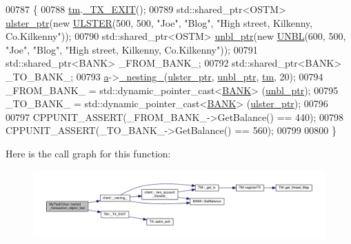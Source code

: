 \begin{DoxyCode}
00787                                                \{
00788     \hyperlink{class_my_test_c_ase_a422e6e5d4ddedea384be96031c89b72b_a422e6e5d4ddedea384be96031c89b72b}{tm}.\hyperlink{class_t_m_a5e2d1127f2429f2f524d25f430eade06_a5e2d1127f2429f2f524d25f430eade06}{\_TX\_EXIT}();
00789     std::shared\_ptr<OSTM> \hyperlink{class_my_test_c_ase_a4f9f72374d3d15be7cdf16412c4d7ed3_a4f9f72374d3d15be7cdf16412c4d7ed3}{ulster\_ptr}(\textcolor{keyword}{new} \hyperlink{class_u_l_s_t_e_r}{ULSTER}(500, 500, \textcolor{stringliteral}{"Joe"}, \textcolor{stringliteral}{"Blog"}, \textcolor{stringliteral}{"High street,
       Kilkenny, Co.Kilkenny"}));
00790     std::shared\_ptr<OSTM> \hyperlink{class_my_test_c_ase_a0ca634b597d6c0e136d632268853d5a7_a0ca634b597d6c0e136d632268853d5a7}{unbl\_ptr}(\textcolor{keyword}{new} \hyperlink{class_u_n_b_l}{UNBL}(600, 500, \textcolor{stringliteral}{"Joe"}, \textcolor{stringliteral}{"Blog"}, \textcolor{stringliteral}{"High street, Kilkenny,
       Co.Kilkenny"}));
00791     std::shared\_ptr<BANK> \_FROM\_BANK\_;
00792     std::shared\_ptr<BANK> \_TO\_BANK\_;
00793     \hyperlink{class_my_test_c_ase_a08f3a55850ffce171406f81f2f6c9c74_a08f3a55850ffce171406f81f2f6c9c74}{a}->\hyperlink{classclient_ac0ebebd379895869c22f8919ad3bd37f_ac0ebebd379895869c22f8919ad3bd37f}{\_nesting\_}(\hyperlink{class_my_test_c_ase_a4f9f72374d3d15be7cdf16412c4d7ed3_a4f9f72374d3d15be7cdf16412c4d7ed3}{ulster\_ptr}, \hyperlink{class_my_test_c_ase_a0ca634b597d6c0e136d632268853d5a7_a0ca634b597d6c0e136d632268853d5a7}{unbl\_ptr}, \hyperlink{class_my_test_c_ase_a422e6e5d4ddedea384be96031c89b72b_a422e6e5d4ddedea384be96031c89b72b}{tm}, 20);
00794     \_FROM\_BANK\_ = std::dynamic\_pointer\_cast<\hyperlink{class_b_a_n_k}{BANK}> (\hyperlink{class_my_test_c_ase_a0ca634b597d6c0e136d632268853d5a7_a0ca634b597d6c0e136d632268853d5a7}{unbl\_ptr});
00795     \_TO\_BANK\_ = std::dynamic\_pointer\_cast<\hyperlink{class_b_a_n_k}{BANK}> (\hyperlink{class_my_test_c_ase_a4f9f72374d3d15be7cdf16412c4d7ed3_a4f9f72374d3d15be7cdf16412c4d7ed3}{ulster\_ptr});
00796     
00797     CPPUNIT\_ASSERT(\_FROM\_BANK\_->GetBalance() == 440);
00798     CPPUNIT\_ASSERT(\_TO\_BANK\_->GetBalance() == 560);
00799     
00800 \}
\end{DoxyCode}


Here is the call graph for this function\+:
\nopagebreak
\begin{figure}[H]
\begin{center}
\leavevmode
\includegraphics[width=350pt]{class_my_test_c_ase_ad5d3718a6ed5ef68ad711456d6defd62_ad5d3718a6ed5ef68ad711456d6defd62_cgraph}
\end{center}
\end{figure}


